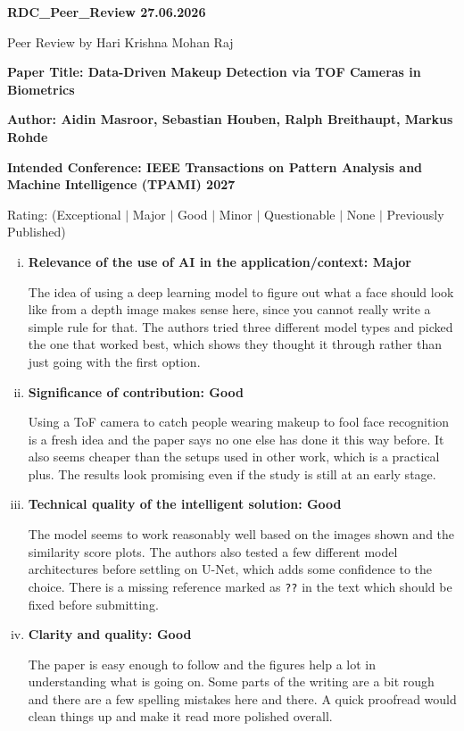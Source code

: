 \documentclass[11pt,a4paper]{article}
\begin{document}
\pagestyle{empty}

{\large\textbf{RDC\_Peer\_Review 27.06.2026}}

Peer Review by Hari Krishna Mohan Raj

\bigskip

\textbf{\large Paper Title: Data-Driven Makeup Detection via TOF Cameras in Biometrics}

\textbf{\large Author: Aidin Masroor, Sebastian Houben, Ralph Breithaupt, Markus Rohde}

\bigskip

\textbf{Intended Conference: IEEE Transactions on Pattern Analysis and Machine Intelligence (TPAMI) 2027}

\bigskip

Rating: (Exceptional $|$ Major $|$ Good $|$ Minor $|$ Questionable $|$ None $|$ Previously Published)

\begin{enumerate}[(i)]

\item \textbf{Relevance of the use of AI in the application/context: Major}

The idea of using a deep learning model to figure out what a face should look like
from a depth image makes sense here, since you cannot really write a simple rule for
that. The authors tried three different model types and picked the one that worked
best, which shows they thought it through rather than just going with the first option.

\item \textbf{Significance of contribution: Good}

Using a ToF camera to catch people wearing makeup to fool face recognition is a
fresh idea and the paper says no one else has done it this way before. It also seems
cheaper than the setups used in other work, which is a practical plus. The results
look promising even if the study is still at an early stage.

\item \textbf{Technical quality of the intelligent solution: Good}

The model seems to work reasonably well based on the images shown and the similarity
score plots. The authors also tested a few different model architectures before
settling on U-Net, which adds some confidence to the choice. There is a missing
reference marked as \texttt{??} in the text which should be fixed before submitting.

\item \textbf{Clarity and quality: Good}

The paper is easy enough to follow and the figures help a lot in understanding what
is going on. Some parts of the writing are a bit rough and there are a few spelling
mistakes here and there. A quick proofread would clean things up and make it read
more polished overall.

\end{enumerate}
\end{document}
